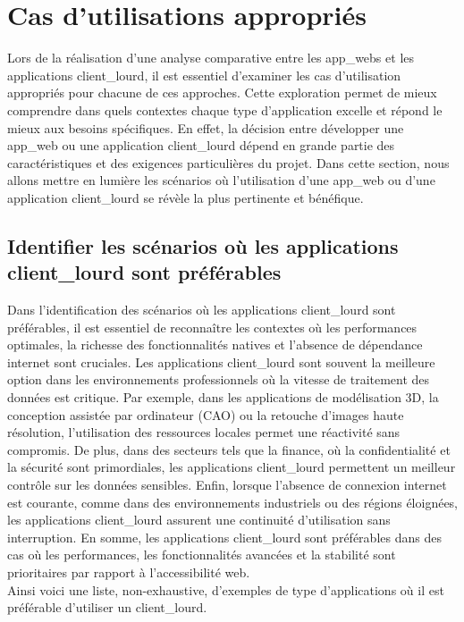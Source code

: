 \documentclass[a4paper, 12pt, french]{article}
\begin{document}
		\section{Cas d'utilisations appropriés}
			Lors de la réalisation d'une analyse comparative entre les \glspl{app_web} et les applications \gls{client_lourd}, il est essentiel d'examiner les cas d'utilisation appropriés pour chacune de ces approches. Cette exploration permet de mieux comprendre dans quels contextes chaque type d'application excelle et répond le mieux aux besoins spécifiques. En effet, la décision entre développer une \gls{app_web} ou une application \gls{client_lourd} dépend en grande partie des caractéristiques et des exigences particulières du projet. Dans cette section, nous allons mettre en lumière les scénarios où l'utilisation d'une \gls{app_web} ou d'une application \gls{client_lourd} se révèle la plus pertinente et bénéfique.

			\subsection{Identifier les scénarios où les applications \gls{client_lourd} sont préférables}
				Dans l'identification des scénarios où les applications \gls{client_lourd} sont préférables, il est essentiel de reconnaître les contextes où les performances optimales, la richesse des fonctionnalités natives et l'absence de dépendance internet sont cruciales. Les applications \gls{client_lourd} sont souvent la meilleure option dans les environnements professionnels où la vitesse de traitement des données est critique. Par exemple, dans les applications de modélisation 3D, la conception assistée par ordinateur (CAO) ou la retouche d'images haute résolution, l'utilisation des ressources locales permet une réactivité sans compromis. De plus, dans des secteurs tels que la finance, où la confidentialité et la sécurité sont primordiales, les applications \gls{client_lourd} permettent un meilleur contrôle sur les données sensibles. Enfin, lorsque l'absence de connexion internet est courante, comme dans des environnements industriels ou des régions éloignées, les applications \gls{client_lourd} assurent une continuité d'utilisation sans interruption. En somme, les applications \gls{client_lourd} sont préférables dans des cas où les performances, les fonctionnalités avancées et la stabilité sont prioritaires par rapport à l'accessibilité web.\\
				
				Ainsi voici une liste, non-exhaustive, d'exemples de type d'applications où il est préférable d'utiliser un \gls{client_lourd}.
				
\end{document}
